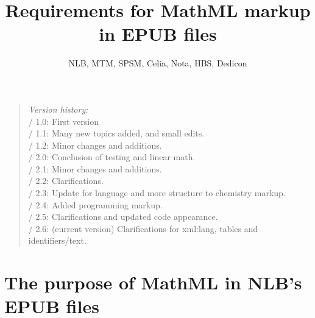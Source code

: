 \documentclass[english,a4paper,11pt]{article}
\title{Requirements for MathML markup\\ in EPUB files}
\author{NLB, MTM, SPSM, Celia, Nota, HBS, Dedicon}
\begin{document}
	\bunntekst
	\thispagestyle{empty}
	\raggedright
	
	\maketitle
	\thispagestyle{empty}
	\vfill
	\begin{quote} {
		\bigskip
		\emph{Version history:}\\
		\textbullet{} / 1.0: First version\\
		\textbullet{} / 1.1: Many new topics added, and small edits.\\
		\textbullet{} / 1.2: Minor changes and additions.\\
		\textbullet{} / 2.0: Conclusion of testing and linear math.\\
        \textbullet{} / 2.1: Minor changes and additions.\\
        \textbullet{} / 2.2: Clarifications.\\
        \textbullet{} / 2.3: Update for language and more structure to chemistry markup.\\
        \textbullet{} / 2.4: Added programming markup.\\
        \textbullet{} / 2.5: Clarifications and updated code appearance.\\
        \textbullet{} / 2.6: (current version) Clarifications for xml:lang, tables and identifiers/text.\\
        \bigskip
	}
	\end{quote}
	\vfill
	\pagebreak
	\tableofcontents
	\vfill
	\pagebreak

\section{The purpose of MathML in NLB's EPUB files}
\end{document}
